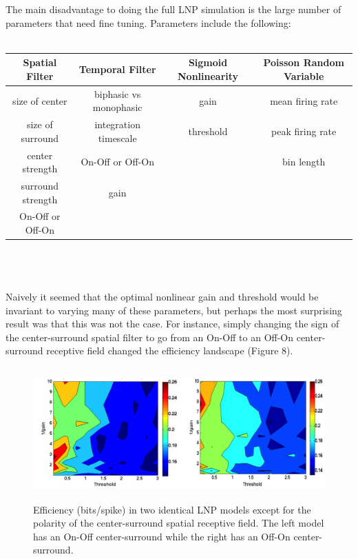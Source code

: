\documentclass[12pt]{article}
\begin{document}
The main disadvantage to doing the full LNP simulation is the large number of parameters that need fine tuning.  Parameters include the following: \\
\\
\begin{tabular}{|c|c|c|c|} \hline
\bf{Spatial Filter} & \bf{Temporal Filter} & \bf{Sigmoid Nonlinearity} & \bf{Poisson Random Variable}  \\ \hline
size of center & biphasic vs monophasic & gain & mean firing rate \\ \hline
size of surround & integration timescale & threshold & peak firing rate \\ \hline
center strength & On-Off or Off-On &  & bin length \\ \hline
surround strength & gain &  &  \\ \hline
On-Off or Off-On &  &  &  \\ \hline
\end{tabular}
\\
\\
\\
Naively it seemed that the optimal nonlinear gain and threshold would be invariant to varying many of these parameters, but perhaps the most surprising result was that this was not the case.  For instance, simply changing the sign of the center-surround spatial filter to go from an On-Off to an Off-On center-surround receptive field changed the efficiency landscape (Figure 8).



\begin{figure}[h!!]
\centerline{\includegraphics*[height = 2.0in,width=6.0in,angle=0]{On_vs_Off.png}}
\label{Figure 7}
\caption{Efficiency (bits/spike) in two identical LNP models except for the polarity of the center-surround spatial receptive field.  The left model has an On-Off center-surround while the right has an Off-On center-surround.}
\end{figure}
\end{document}
